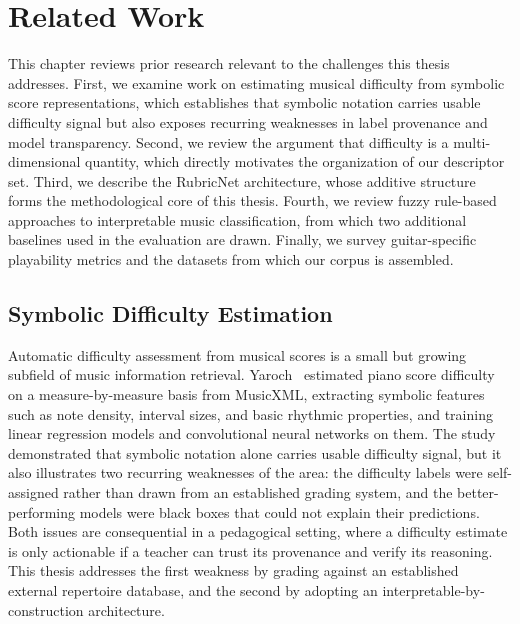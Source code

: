 \chapter{Related Work}
\label{ch:related_work}

This chapter reviews prior research relevant to the challenges this thesis addresses. First, we examine work on estimating musical difficulty from symbolic score representations, which establishes that symbolic notation carries usable difficulty signal but also exposes recurring weaknesses in label provenance and model transparency. Second, we review the argument that difficulty is a multi-dimensional quantity, which directly motivates the organization of our descriptor set. Third, we describe the RubricNet architecture, whose additive structure forms the methodological core of this thesis. Fourth, we review fuzzy rule-based approaches to interpretable music classification, from which two additional baselines used in the evaluation are drawn. Finally, we survey guitar-specific playability metrics and the datasets from which our corpus is assembled.

\section{Symbolic Difficulty Estimation}
Automatic difficulty assessment from musical scores is a small but growing subfield of music information retrieval. Yaroch~\cite{yaroch2025measure} estimated piano score difficulty on a measure-by-measure basis from MusicXML, extracting symbolic features such as note density, interval sizes, and basic rhythmic properties, and training linear regression models and convolutional neural networks on them. The study demonstrated that symbolic notation alone carries usable difficulty signal, but it also illustrates two recurring weaknesses of the area: the difficulty labels were self-assigned rather than drawn from an established grading system, and the better-performing models were black boxes that could not explain their predictions. Both issues are consequential in a pedagogical setting, where a difficulty estimate is only actionable if a teacher can trust its provenance and verify its reasoning. This thesis addresses the first weakness by grading against an established external repertoire database, and the second by adopting an interpretable-by-construction architecture.

